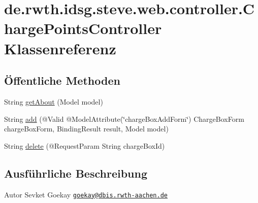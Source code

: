 \hypertarget{classde_1_1rwth_1_1idsg_1_1steve_1_1web_1_1controller_1_1_charge_points_controller}{\section{de.\-rwth.\-idsg.\-steve.\-web.\-controller.\-Charge\-Points\-Controller Klassenreferenz}
\label{classde_1_1rwth_1_1idsg_1_1steve_1_1web_1_1controller_1_1_charge_points_controller}
}
\subsection*{Öffentliche Methoden}
\begin{DoxyCompactItemize}
\item 
String \hyperlink{classde_1_1rwth_1_1idsg_1_1steve_1_1web_1_1controller_1_1_charge_points_controller_a289786540c7093c5aad0a47d2585d4b9}{get\-About} (Model model)
\item 
String \hyperlink{classde_1_1rwth_1_1idsg_1_1steve_1_1web_1_1controller_1_1_charge_points_controller_a7218eea1c8f4716ff582bd133561ff7d}{add} (@Valid @Model\-Attribute(\char`\"{}charge\-Box\-Add\-Form\char`\"{}) Charge\-Box\-Form charge\-Box\-Form, Binding\-Result result, Model model)
\item 
String \hyperlink{classde_1_1rwth_1_1idsg_1_1steve_1_1web_1_1controller_1_1_charge_points_controller_a95a5ab40e133378b68d68fb947fb44a0}{delete} (@Request\-Param String charge\-Box\-Id)
\end{DoxyCompactItemize}


\subsection{Ausführliche Beschreibung}
\begin{DoxyAuthor}{Autor}
Sevket Goekay \href{mailto:goekay@dbis.rwth-aachen.de}{\tt goekay@dbis.\-rwth-\/aachen.\-de} 
\end{DoxyAuthor}



